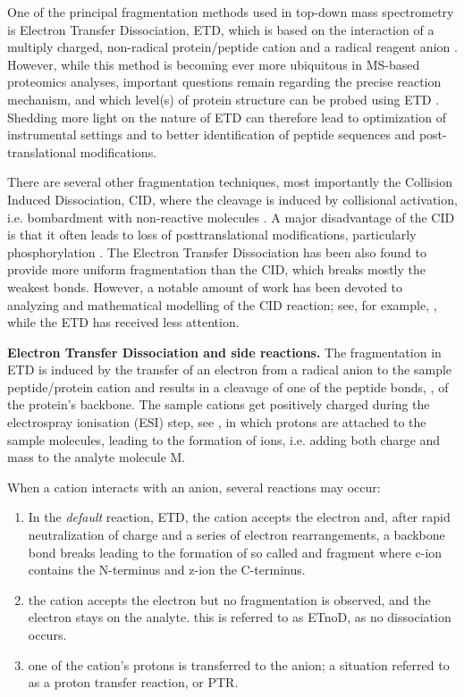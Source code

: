 \documentclass{llncs}
\begin{document}
        One of the principal fragmentation methods used in top-down mass spectrometry is Electron Transfer Dissociation, ETD, which is based on the interaction of a multiply charged, non-radical protein/peptide cation and a radical reagent anion \cite{Syka2004-rg,Zhurov2013-ua}. However, while this method is becoming ever more ubiquitous in MS-based proteomics analyses, important questions remain regarding the precise reaction mechanism, and which level(s) of protein structure can be probed using ETD \cite{Sohn2009-zv,Sohn2015-rp}. Shedding more light on the nature of ETD can therefore lead to optimization of instrumental settings and to better identification of peptide sequences and post-translational modifications.

        There are several other fragmentation techniques, most importantly the Collision Induced Dissociation, CID, where the cleavage is induced by collisional activation, i.e. bombardment with non-reactive molecules \cite{Mitchell_Wells2005-gn}. A major disadvantage of the CID is that it often leads to loss of posttranslational modifications, particularly phosphorylation \cite{Kim2012-yz}. The Electron Transfer Dissociation has been also found to provide more uniform fragmentation than the CID, which breaks mostly the weakest bonds\cite{Kim2012-yz,Zhurov2013-ua}. However, a notable amount of work has been devoted to analyzing and mathematical modelling of the CID reaction; see, for example, \cite{Zhang2004-fp,Zhang2005-jn,Wysocki2000-am}, while the ETD has received less attention.

\textbf{Electron Transfer Dissociation and side reactions.}
        The fragmentation in ETD is induced by the transfer of an electron from a radical anion to the sample peptide/protein cation and results in a cleavage of one of the peptide bonds, , of the protein’s backbone. The sample cations get positively charged during the electrospray ionisation (ESI) step, see \cite{Fenn1989-mp}, in which protons are attached to the sample molecules, leading to the formation of  ions, i.e. adding both charge and mass to the analyte molecule M.

        When a cation interacts with an anion, several reactions may occur:

        \begin{enumerate}
                \item In the \textit{default} reaction, ETD, the cation accepts the electron and, after rapid neutralization of charge and a series of electron rearrangements, a backbone  bond breaks leading to the formation of so called  and  fragment where c-ion contains the N-terminus and z-ion the C-terminus.

                \item the cation accepts the electron but no fragmentation is observed, and the electron stays on the analyte. this is referred to as ETnoD, as no dissociation occurs.

                \item one of the cation’s protons is transferred to the anion; a situation referred to as a proton transfer reaction, or PTR.
        \end{enumerate}
\end{document}
